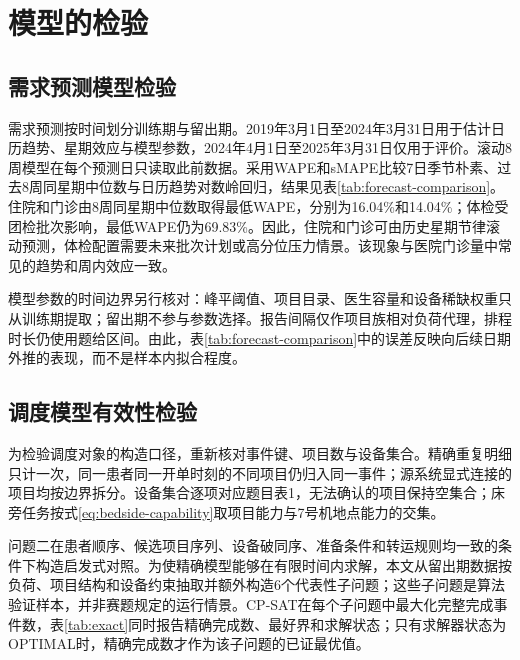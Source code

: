 \section{模型的检验}

\subsection{需求预测模型检验}

需求预测按时间划分训练期与留出期。2019年3月1日至2024年3月31日用于估计日历趋势、星期效应与模型参数，2024年4月1日至2025年3月31日仅用于评价。滚动8周模型在每个预测日只读取此前数据。采用WAPE和sMAPE比较7日季节朴素、过去8周同星期中位数与日历趋势对数岭回归，结果见表\ref{tab:forecast-comparison}。住院和门诊由8周同星期中位数取得最低WAPE，分别为16.04\%和14.04\%；体检受团检批次影响，最低WAPE仍为69.83\%。因此，住院和门诊可由历史星期节律滚动预测，体检配置需要未来批次计划或高分位压力情景。该现象与医院门诊量中常见的趋势和周内效应一致\cite{zhu2015,xiang2009}。

模型参数的时间边界另行核对：峰平阈值、项目目录、医生容量和设备稀缺权重只从训练期提取；留出期不参与参数选择。报告间隔仅作项目族相对负荷代理，排程时长仍使用题给区间。由此，表\ref{tab:forecast-comparison}中的误差反映向后续日期外推的表现，而不是样本内拟合程度。

\subsection{调度模型有效性检验}

为检验调度对象的构造口径，重新核对事件键、项目数与设备集合。精确重复明细只计一次，同一患者同一开单时刻的不同项目仍归入同一事件；源系统显式连接的项目均按边界拆分。设备集合逐项对应题目表1，无法确认的项目保持空集合；床旁任务按式\eqref{eq:bedside-capability}取项目能力与7号机地点能力的交集。

问题二在患者顺序、候选项目序列、设备破同序、准备条件和转运规则均一致的条件下构造启发式对照。为使精确模型能够在有限时间内求解，本文从留出期数据按负荷、项目结构和设备约束抽取并额外构造6个代表性子问题；这些子问题是算法验证样本，并非赛题规定的运行情景。CP-SAT在每个子问题中最大化完整完成事件数，表\ref{tab:exact}同时报告精确完成数、最好界和求解状态；只有求解器状态为OPTIMAL时，精确完成数才作为该子问题的已证最优值。

\begin{table}[H]
\centering
\caption{问题二构造算法与CP-SAT精确子问题对照}
\label{tab:exact}

\end{table}

